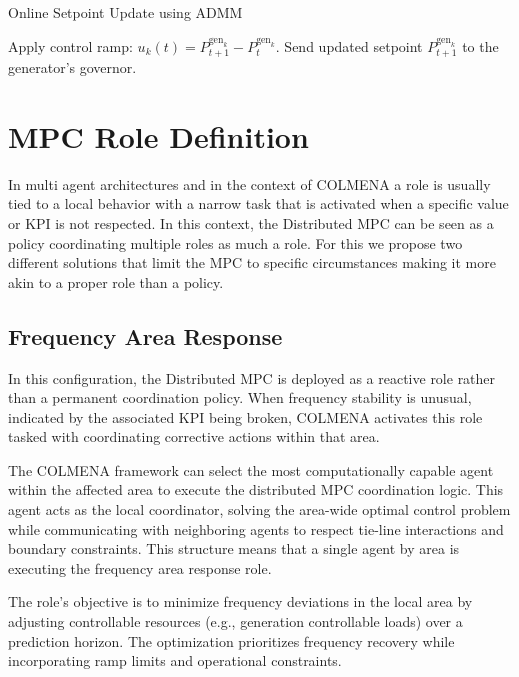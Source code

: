 \documentclass{article}
\begin{document}
\begin{algorithm}
\caption{Online Setpoint Update using ADMM}
\begin{algorithmic}
        \State Apply control ramp: $u_k(t) = P^{\text{gen}_k}_{t+1} - P^{\text{gen}_k}_t$.
        \State Send updated setpoint $P^{\text{gen}_k}_{t+1}$ to the generator's governor.
    \EndFor
\end{algorithmic}
\end{algorithm}

\section{MPC Role Definition}

In multi agent architectures and in the context of COLMENA a role is usually tied to a local behavior with a narrow task that is activated when a specific value or KPI is not respected. In this context, the Distributed MPC can be seen as a policy coordinating multiple roles as much a role. For this we propose two different solutions that limit the MPC to specific circumstances making it more akin to a proper role than a policy.

\subsection{Frequency Area Response}

In this configuration, the Distributed MPC is deployed as a reactive role rather than a permanent coordination policy. When frequency stability is unusual, indicated by the associated KPI being broken, COLMENA activates this role tasked with coordinating corrective actions within that area.

The COLMENA framework can select the most computationally capable agent within the affected area to execute the distributed MPC coordination logic. This agent acts as the local coordinator, solving the area-wide optimal control problem while communicating with neighboring agents to respect tie-line interactions and boundary constraints. This structure means that a single agent by area is executing the frequency area response role.

The role's objective is to minimize frequency deviations in the local area by adjusting controllable resources (e.g., generation controllable loads) over a prediction horizon. The optimization prioritizes frequency recovery while incorporating ramp limits and operational constraints.
 
\end{document}
